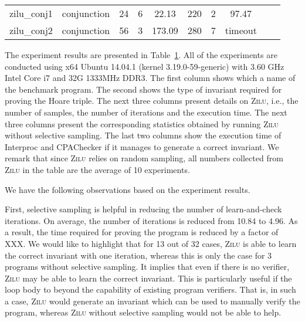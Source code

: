 \begin{table}[t]
\begin{tabular}{l c | c c c | c c c | c c }
\multicolumn{1}{|c|}{zilu\_conj1}         					&conjunction 	&24 &6 &22.13  			&220  &2  &97.47  			& &  \\
\multicolumn{1}{|c|}{zilu\_conj2}         					&conjunction 	&56 &3 &173.09  		&280  &7  &timeout  		& &  \\

\hline
\end{tabular}
\label{tbl:stats}
\end{table}

The experiment results are presented in Table~\ref{tbl:stats}. All of the experiments are conducted using x64 Ubuntu 14.04.1 (kernel 3.19.0-59-generic) with 3.60 GHz Intel Core i7 and 32G 1333MHz DDR3.
The first column shows which a name of the benchmark program. 
The second shows the type of invariant required for proving the Hoare triple. 
The next three columns present details on \textsc{Zilu}, i.e., the number of samples, the number of iterations and the execution time. 
The next three columns present the corresponding statistics obtained by running \textsc{Zilu} without selective sampling. 
The last two columns show the execution time of Interproc and CPAChecker if it manages to generate a correct invariant.
We remark that since \textsc{Zilu} relies on random sampling, all numbers collected from \textsc{Zilu} in the table are the average of 10 experiments.

We have the following observations based on the experiment results. 

First, selective sampling is helpful in reducing the number of learn-and-check iterations. 
On average, the number of iterations is reduced from 10.84 to 4.96. As a result, the time required for proving the program is reduced by a factor of XXX. 
We would like to highlight that for 13 out of 32 cases, \textsc{Zilu} is able to learn the correct invariant with one iteration, whereas this is only the case for 3 programs without selective sampling. It implies that even if there is no verifier, \textsc{Zilu} may be able to learn the correct invariant. 
This is particularly useful if the loop body to beyond the capability of existing program verifiers. 
That is, in such a case, \textsc{Zilu} would generate an invariant which can be used to manually verify the program, whereas \textsc{Zilu} without selective sampling would not be able to help. 


